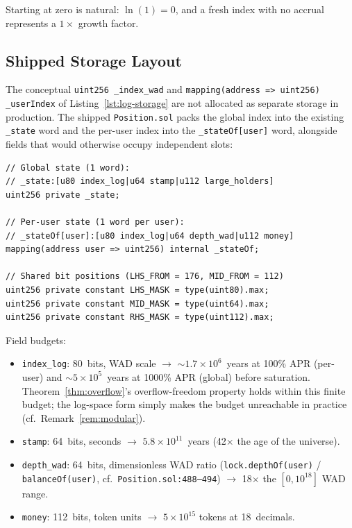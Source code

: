 \documentclass[10pt,a4paper,twocolumn]{article}
\begin{document}
Starting at zero is natural: $\ln(1) = 0$, and a fresh index with no accrual represents a $1\times$ growth factor.

\subsection{Shipped Storage Layout}
\label{subsec:shipped-layout}

The conceptual \texttt{uint256 \_index\_wad} and \texttt{mapping(address \texttt{=>} uint256) \_userIndex} of Listing~\ref{lst:log-storage} are not allocated as separate storage in production. The shipped \texttt{Position.sol} packs the global index into the existing \texttt{\_state} word and the per-user index into the \texttt{\_stateOf[user]} word, alongside fields that would otherwise occupy independent slots:

\begin{lstlisting}[language=Solidity, caption={Packed Position storage (Position.sol:511--608)}, label={lst:packed-state}]
// Global state (1 word):
// _state:[u80 index_log|u64 stamp|u112 large_holders]
uint256 private _state;

// Per-user state (1 word per user):
// _stateOf[user]:[u80 index_log|u64 depth_wad|u112 money]
mapping(address user => uint256) internal _stateOf;

// Shared bit positions (LHS_FROM = 176, MID_FROM = 112)
uint256 private constant LHS_MASK = type(uint80).max;
uint256 private constant MID_MASK = type(uint64).max;
uint256 private constant RHS_MASK = type(uint112).max;
\end{lstlisting}

Field budgets:

\begin{itemize}[leftmargin=*, nosep]
\item \texttt{index\_log}: 80~bits, WAD scale $\to$ ${\sim}1.7 \times 10^6$~years at 100\% APR (per-user) and ${\sim}5 \times 10^5$~years at 1000\% APR (global) before saturation. Theorem~\ref{thm:overflow}'s overflow-freedom property holds within this finite budget; the log-space form simply makes the budget unreachable in practice (cf.\ Remark~\ref{rem:modular}).
\item \texttt{stamp}: 64~bits, seconds $\to$ $5.8 \times 10^{11}$~years (42$\times$ the age of the universe).
\item \texttt{depth\_wad}: 64~bits, dimensionless WAD ratio (\texttt{lock.depthOf(user)} / \texttt{balanceOf(user)}, cf.\ \texttt{Position.sol:488--494}) $\to$ 18$\times$ the $[0, 10^{18}]$ WAD range.
\item \texttt{money}: 112~bits, token units $\to$ $5 \times 10^{15}$ tokens at 18~decimals.
\end{itemize}
\end{document}

